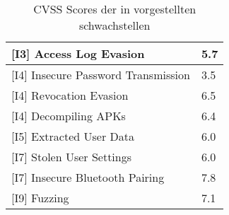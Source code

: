 \begin{table}[H]
\begin{tabular}{|l|l|}
{[}I3{]} Access Log Evasion                 & \cellcolor{orange}5.7            \\ \hline
\rowcolor{light-gray}
{[}I4{]} Insecure Password Transmission     & \cellcolor{yellow}3.5            \\ \hline
{[}I4{]} Revocation Evasion                 & \cellcolor{orange}6.5            \\ \hline
\rowcolor{light-gray}
{[}I4{]} Decompiling APKs                   & \cellcolor{orange}6.4            \\ \hline
{[}I5{]} Extracted User Data                & \cellcolor{orange}6.0            \\ \hline
\rowcolor{light-gray}
{[}I7{]} Stolen User Settings               & \cellcolor{orange}6.0            \\ \hline
{[}I7{]} Insecure Bluetooth Pairing         & \cellcolor{redorange}7.8            \\ \hline
\rowcolor{light-gray}
{[}I9{]} Fuzzing                            & \cellcolor{redorange}7.1            \\ \hline
        \end{tabular}
        \caption[CVSS Scores des Prototypen]{CVSS Scores der in  vorgestellten schwachstellen}
        \label{tab:vulns_cvss_short}
    \end{table}
